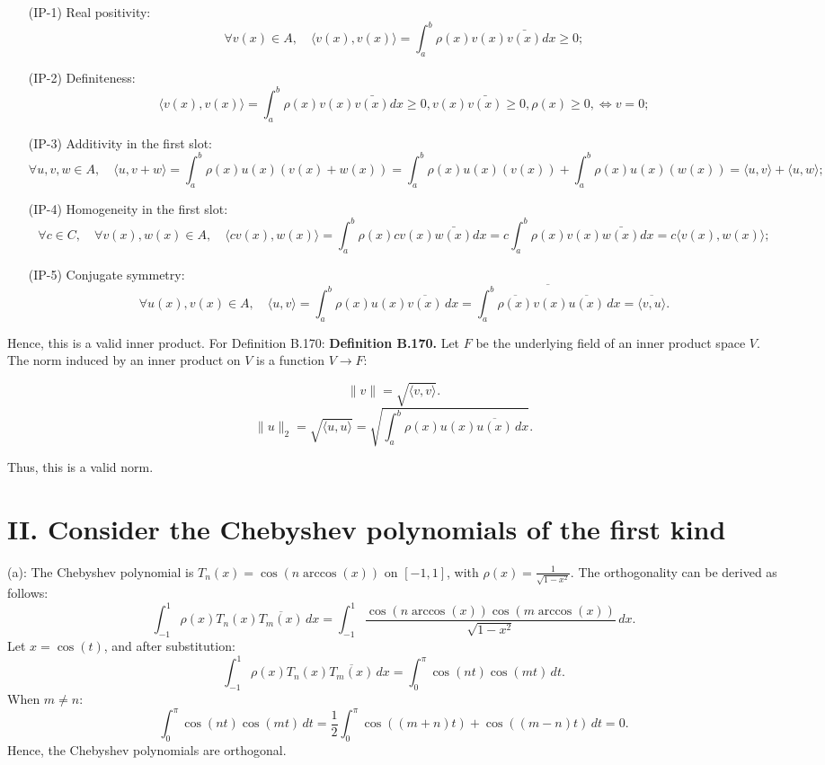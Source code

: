 \documentclass[a4paper]{article}
\begin{document}
\begin{enumerate}
    \item[(IP-1)] Real positivity: 
    \[
    \forall v(x) \in A, \quad \langle v(x), v(x) \rangle=\int_{a}^{b} \rho(x)v(x)\bar{v(x)} dx \geq 0;
    \]
    \item[(IP-2)] Definiteness: 
    \[
    \langle v(x), v(x) \rangle=\int_{a}^{b} \rho(x)v(x)\bar{v(x)} dx \geq 0, v(x)\bar{v(x)} \geq 0, \rho(x) \geq 0, \iff v = 0;
    \]
    \item[(IP-3)] Additivity in the first slot:
    \[
    \forall u, v, w \in A, \quad \langle u, v + w \rangle=\int_{a}^{b} \rho(x)u(x)(v(x)+w(x))=\int_{a}^{b} \rho(x)u(x)(v(x))+\int_{a}^{b} \rho(x)u(x)(w(x)) = \langle u, v \rangle + \langle u, w \rangle;
    \]
    \item[(IP-4)] Homogeneity in the first slot:
    \[
    \forall c \in C, \quad \forall v(x), w(x) \in A, \quad \langle c v(x), w(x) \rangle=\int_{a}^{b} \rho(x)cv(x)\bar{w(x)} dx=c\int_{a}^{b} \rho(x)v(x)\bar{w(x)} dx = c \langle v(x), w(x) \rangle;
    \]
    \item[(IP-5)] Conjugate symmetry:
    \[
    \forall u(x), v(x) \in A, \quad 
    \langle u, v \rangle = \int_{a}^{b} \rho(x) u(x) \overline{v(x)} \, dx = \overline{\int_{a}^{b} \overline{\rho(x)} v(x) \overline{u(x)} \, dx} = \overline{\langle v, u \rangle}.
    \]
\end{enumerate}

Hence, this is a valid inner product. 
For Definition B.170:
\textbf{Definition B.170.} Let \( F \) be the underlying field of an inner product space \( V \). The norm induced by an inner product on \( V \) is a function \( V \to F \):

\[
\|v\| = \sqrt{\langle v, v \rangle}.
\]
\[
\|u\|_2 = \sqrt{\langle u, u \rangle} = \sqrt{\int_{a}^{b} \rho(x) u(x)\overline{u(x)} \, dx}.
\]

Thus, this is a valid norm.

\section*{II. Consider the Chebyshev polynomials of the first kind}

(a):  
The Chebyshev polynomial is \( T_n(x) = \cos(n\arccos(x)) \) on \([-1,1]\), with \( \rho(x) = \frac{1}{\sqrt{1-x^2}} \).  
The orthogonality can be derived as follows:  
\[
\int_{-1}^{1} \rho(x) T_n(x) \overline{T_m(x)} \, dx = \int_{-1}^{1} \frac{\cos(n \arccos(x)) \cos(m \arccos(x))}{\sqrt{1-x^2}} \, dx.
\]
Let \( x = \cos(t) \), and after substitution:  
\[
\int_{-1}^{1} \rho(x) T_n(x) \overline{T_m(x)} \, dx = \int_{0}^{\pi} \cos(nt) \cos(mt) \, dt.
\]
When \( m \neq n \):  
\[
\int_{0}^{\pi} \cos(nt) \cos(mt) \, dt = \frac{1}{2} \int_{0}^{\pi} \cos((m+n)t) + \cos((m-n)t) \, dt = 0.
\]
Hence, the Chebyshev polynomials are orthogonal.
\end{document}
